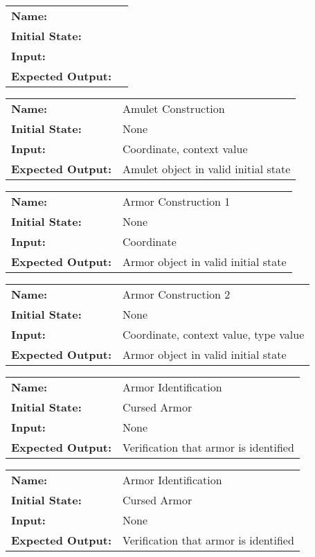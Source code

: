 \documentclass[12pt, titlepage]{article}
\begin{document}
\begin{center}

\begin{tabular}{ l | l }
\hline
\textbf{Name:} & \\
\textbf{Initial State:} & \\
\textbf{Input:} & \\
\textbf{Expected Output:} & \\
\hline
\end{tabular}

\begin{tabular}{ l | l }
\hline
\textbf{Name:} & Amulet Construction\\
\textbf{Initial State:} & None\\
\textbf{Input:} & Coordinate, context value\\
\textbf{Expected Output:} & Amulet object in valid initial state\\
\hline
\end{tabular}

\begin{tabular}{ l | l }
\hline
\textbf{Name:} & Armor Construction 1\\
\textbf{Initial State:} & None\\
\textbf{Input:} & Coordinate\\
\textbf{Expected Output:} & Armor object in valid initial state\\
\hline
\end{tabular}

\begin{tabular}{ l | l }
\hline
\textbf{Name:} & Armor Construction 2\\
\textbf{Initial State:} & None\\
\textbf{Input:} & Coordinate, context value, type value\\
\textbf{Expected Output:} & Armor object in valid initial state\\
\hline
\end{tabular}

\begin{tabular}{ l | l }
\hline
\textbf{Name:} & Armor Identification\\
\textbf{Initial State:} & Cursed Armor\\
\textbf{Input:} & None\\
\textbf{Expected Output:} & Verification that armor is identified\\
\hline
\end{tabular}

\begin{tabular}{ l | l }
\hline
\textbf{Name:} & Armor Identification\\
\textbf{Initial State:} & Cursed Armor\\
\textbf{Input:} & None\\
\textbf{Expected Output:} & Verification that armor is identified\\
\hline
\end{tabular}

\end{center}
		
\end{document}
